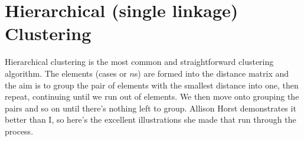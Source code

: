 \documentclass[
]{book}
\begin{document}
\hypertarget{hierarchical-single-linkage-clustering}{%
\section{Hierarchical (single linkage) Clustering}\label{hierarchical-single-linkage-clustering}}

Hierarchical clustering is the most common and straightforward clustering algorithm. The elements (cases or \(n\)s) are formed into the distance matrix and the aim is to group the pair of elements with the smallest distance into one, then repeat, continuing until we run out of elements. We then move onto grouping the pairs and so on until there's nothing left to group. Allison Horst demonstrates it better than I, so here's the excellent illustrations she made that run through the process.
\end{document}
